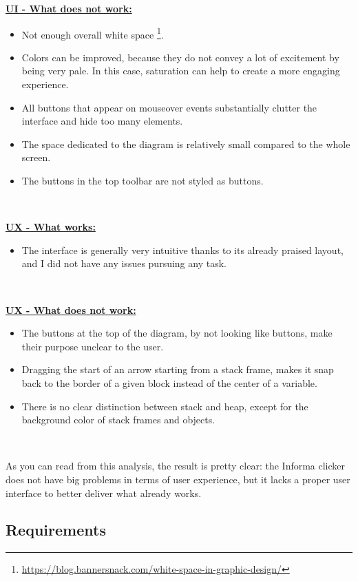 \documentclass[]{usiinfbachelorproject}
\begin{document}
\textbf{\ul{UI - What does not work:}}

\begin{itemize}
	\item Not enough overall white space \footnote{\url{https://blog.bannersnack.com/white-space-in-graphic-design/}}.
	\item Colors can be improved, because they do not convey a lot of excitement by being very pale. In this case, saturation can help to create a more engaging experience.
	\item All buttons that appear on mouseover events substantially clutter the interface and hide too many elements.
	\item The space dedicated to the diagram is relatively small compared to the whole screen.
	\item The buttons in the top toolbar are not styled as buttons.
\end{itemize}\

\textbf{\ul{UX - What works:}}

\begin{itemize}
	\item The interface is generally very intuitive thanks to its already praised layout, and I did not have any issues pursuing any task.
\end{itemize}\

\textbf{\ul{UX - What does not work:}}

\begin{itemize}
	\item The buttons at the top of the diagram, by not looking like buttons, make their purpose unclear to the user.
	\item Dragging the start of an arrow starting from a stack frame, makes it snap back to the border of a given block instead of the center of a variable.
	\item There is no clear distinction between stack and heap, except for the background color of stack frames and objects.
\end{itemize}\

\noindent As you can read from this analysis, the result is pretty clear: the Informa clicker does not have big problems in terms of user experience, but it lacks a proper user interface to better deliver what already works.

\vspace{\fill}
\pagebreak

\subsection{Requirements}
\end{document}
